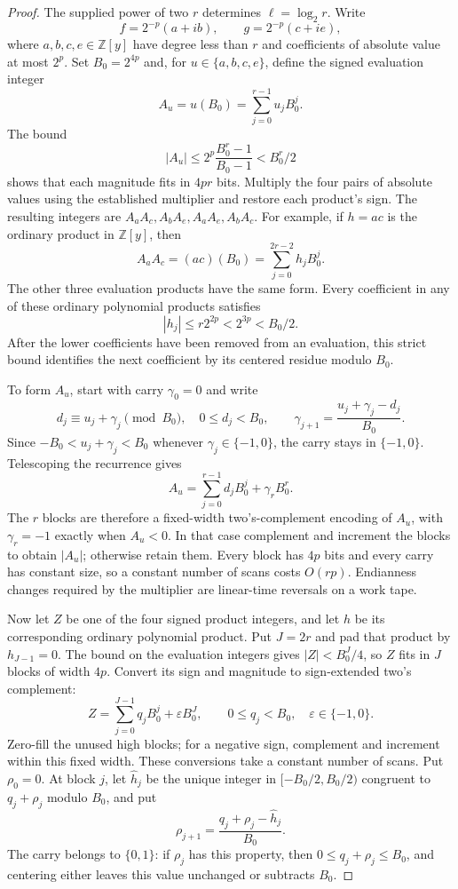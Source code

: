 \begin{proof}
The supplied power of two $r$ determines $\ell=\log_2r$.
Write
\[
 f=2^{-p}(a+ib),\qquad g=2^{-p}(c+ie),
\]
where $a,b,c,e\in\mathbb Z[y]$ have degree less than $r$ and
coefficients of absolute value at most $2^p$.  Set $B_0=2^{4p}$
and, for $u\in\{a,b,c,e\}$, define the signed evaluation integer
\[
       A_u=u(B_0)=\sum_{j=0}^{r-1}u_jB_0^j.
\]
The bound
\[
 |A_u|\leq2^p\frac{B_0^r-1}{B_0-1}<B_0^r/2
\]
shows that each magnitude fits in $4pr$ bits.  Multiply the four
pairs of absolute values using the established multiplier and restore
each product's sign.  The resulting integers are
$A_aA_c,A_bA_e,A_aA_e,A_bA_c$.  For example, if
$h=ac$ is the ordinary product in $\mathbb Z[y]$, then
\[
       A_aA_c=(ac)(B_0)=\sum_{j=0}^{2r-2}h_jB_0^j.
\]
The other three evaluation products have the same form.  Every
coefficient in any of these ordinary polynomial products satisfies
\begin{equation}
      |h_j|\leq r2^{2p}<2^{3p}<B_0/2.
 \label{eq:packing-separation}
\end{equation}
After the lower coefficients have been removed from an evaluation,
this strict bound identifies the next coefficient by its centered
residue modulo $B_0$.

To form $A_u$, start with carry $\gamma_0=0$ and write
\[
 d_j\equiv u_j+\gamma_j\pmod{B_0},\quad 0\leq d_j<B_0,
 \qquad \gamma_{j+1}=\frac{u_j+\gamma_j-d_j}{B_0}.
\]
Since $-B_0<u_j+\gamma_j<B_0$ whenever
$\gamma_j\in\{-1,0\}$, the carry stays in $\{-1,0\}$.  Telescoping
the recurrence gives
\[
       A_u=\sum_{j=0}^{r-1}d_jB_0^j+\gamma_rB_0^r.
\]
The $r$ blocks are therefore a fixed-width two's-complement encoding
of $A_u$, with $\gamma_r=-1$ exactly when $A_u<0$.  In that case
complement and increment the blocks to obtain $|A_u|$; otherwise
retain them.  Every block has $4p$ bits and every carry has constant
size, so a constant number of scans costs $O(rp)$.  Endianness
changes required by the multiplier are linear-time reversals on a
work tape.

Now let $Z$ be one of the four signed product integers, and let $h$
be its corresponding ordinary polynomial product.  Put $J=2r$ and
pad that product by $h_{J-1}=0$.  The bound on the evaluation integers
gives $|Z|<B_0^J/4$, so $Z$ fits in $J$ blocks of width $4p$.
Convert its sign and magnitude to sign-extended two's complement:
\[
 Z=\sum_{j=0}^{J-1}q_jB_0^j+\varepsilon B_0^J,
 \qquad 0\leq q_j<B_0,\quad \varepsilon\in\{-1,0\}.
\]
Zero-fill the unused high blocks; for a negative sign, complement
and increment within this fixed width.  These conversions take a
constant number of scans.
Put $\rho_0=0$.  At block $j$, let $\widehat h_j$ be the unique
integer in $[-B_0/2,B_0/2)$ congruent to $q_j+\rho_j$ modulo $B_0$,
and put
\[
       \rho_{j+1}=
          \frac{q_j+\rho_j-\widehat h_j}{B_0}.
\]
The carry belongs to $\{0,1\}$: if $\rho_j$ has this property, then
$0\leq q_j+\rho_j\leq B_0$, and centering either leaves this value
unchanged or subtracts $B_0$.


\end{proof}
